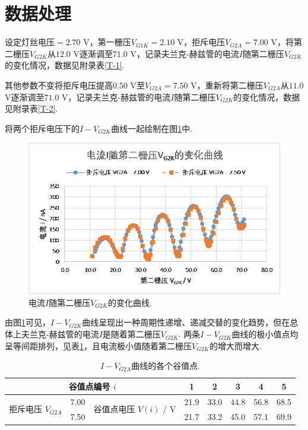 \documentclass[UTF8,10pt,a4paper]{article}
\begin{document}
\thispagestyle{FirstPageStyle}
\section{数据处理}
设定灯丝电压$=2.70$ V，第一栅压$V_{G1K}=2.10$ V，拒斥电压$V_{G2A}=7.00$ V，将第二栅压$V_{G2K}$从$12.0$ V逐渐调至$71.0$ V，记录夫兰克-赫兹管的电流$I$随第二栅压$V_{G2K}$的变化情况，数据见附录表\ref{T-1}.

其他参数不变将拒斥电压提高$0.50$ V至$V_{G2A}=7.50$ V，重新将第二栅压$V_{G2A}$从$11.0$ V逐渐调至$71.0$ V，记录夫兰克-赫兹管的电流$I$随第二栅压$V_{G2K}$的变化情况，数据见附录表\ref{T-2}.

将两个拒斥电压下的$I-V_{G2K}$曲线一起绘制在图\ref{F-1}中.

\begin{figure}[h]
    \centering
    \includegraphics[width=.8\textwidth]{I-VG2K.png}
    \caption{电流$I$随第二栅压$V_{G2K}$的变化曲线.}
    \label{F-1}
\end{figure}

由图\ref{F-1}可见，$I-V_{G2K}$曲线呈现出一种周期性递增、递减交替的变化趋势，但在总体上夫兰克-赫兹管的电流$I$是随着第二栅压$V_{G2K}$. 两条$I-V_{G2K}$曲线的极小值点均呈等间距排列，见表\ref{T-3}，且电流极小值随着第二栅压$V_{G2K}$的增大而增大.

\begin{table}[h]
    \centering
    \caption{$I-V_{G2A}$曲线的各个谷值点.}
    \label{T-3}
    \begin{tabular}{|c|c|c|c|c|c|c|c|}
    \hline
    \multicolumn{3}{|c|}{谷值点编号 $i$} & 1 & 2 & 3 & 4 & 5 \\ \hline
    \multirow{2}{*}{拒斥电压 $V_{G2A}$} & 7.00 & \multirow{2}{*}{谷值点电压   $V(i)$ / V} & 21.9 & 33.0 & 44.8 & 56.8 & 68.5 \\ \cline{2-2} \cline{4-8} 
        & 7.50 &  & 21.7 & 33.2 & 45.0 & 57.1 & 69.9 \\ \hline
    \end{tabular}
\end{table}
\end{document}
